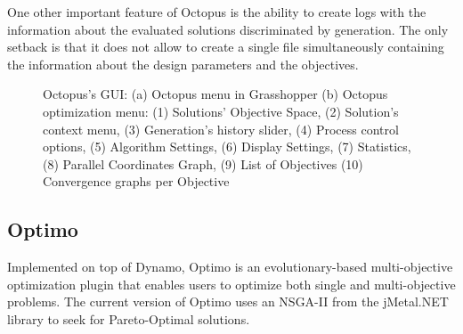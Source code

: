 One other important feature of Octopus is the ability to create logs with the information about the evaluated solutions discriminated by generation. The only setback is that it does not allow to create a single file simultaneously containing the information about the design parameters and the objectives. 

\begin{figure}[htbp]
	\centering
	\hfill
	\caption[Octopus GUI]{Octopus's \ac{GUI}: (a) Octopus menu in Grasshopper (b) Octopus optimization menu: (1) Solutions' Objective Space, (2) Solution's context menu, (3) Generation's history slider, (4) Process control options, (5) Algorithm Settings, (6) Display Settings, (7) Statistics, (8) Parallel Coordinates Graph, (9) List of Objectives (10) Convergence graphs per Objective}
	\label{fig:octopus}
	
\end{figure}


\subsection{Optimo}
\label{subsec:Optimo}

Implemented on top of Dynamo, Optimo is an evolutionary-based multi-objective optimization plugin that enables users to optimize both single and multi-objective problems. The current version of Optimo uses an \ac{NSGA-II} \cite{Deb2002} from the jMetal.NET library to seek for Pareto-Optimal solutions. 



